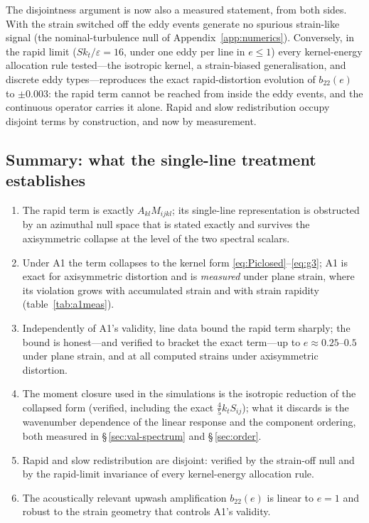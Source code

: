 \documentclass[11pt,a4paper]{article}
\begin{document}
The disjointness argument is now also a measured statement, from both
sides. With the strain switched off the eddy events generate no spurious
strain-like signal (the nominal-turbulence null of
Appendix~\ref{app:numerics}). Conversely, in the rapid limit
($Sk_t/\varepsilon=16$, under one eddy per line in $e\le1$) every
kernel-energy allocation rule tested---the isotropic kernel, a
strain-biased generalisation, and discrete eddy types---reproduces the
exact rapid-distortion evolution of $b_{22}(e)$ to $\pm0.003$: the rapid
term cannot be reached from inside the eddy events, and the continuous
operator carries it alone. Rapid and slow redistribution occupy disjoint
terms by construction, and now by measurement.

\subsection{Summary: what the single-line treatment establishes}
\label{sec:gate-summary}

\begin{enumerate}
\item The rapid term is exactly $A_{kl}M_{ijkl}$; its single-line
  representation is obstructed by an azimuthal null space that is stated
  exactly and survives the axisymmetric collapse at the level of the two
  spectral scalars.
\item Under A1 the term collapses to the kernel form
  \eqref{eq:Piclosed}--\eqref{eq:g3}; A1 is exact for axisymmetric
  distortion and is \emph{measured} under plane strain, where its violation
  grows with accumulated strain and with strain rapidity
  (table~\ref{tab:a1meas}).
\item Independently of A1's validity, line data bound the rapid term
  sharply; the bound is honest---and verified to bracket the exact
  term---up to $e\approx0.25$--$0.5$ under plane strain, and at all
  computed strains under axisymmetric distortion.
\item The moment closure used in the simulations is the isotropic reduction
  of the collapsed form (verified, including the exact
  $\tfrac45k_tS_{ij}$); what it discards is the wavenumber dependence of
  the linear response and the component ordering, both measured in
  \S\,\ref{sec:val-spectrum} and \S\,\ref{sec:order}.
\item Rapid and slow redistribution are disjoint: verified by the
  strain-off null and by the rapid-limit invariance of every kernel-energy
  allocation rule.
\item The acoustically relevant upwash amplification $b_{22}(e)$ is linear
  to $e=1$ and robust to the strain geometry that controls A1's validity.
\end{enumerate}
\end{document}
